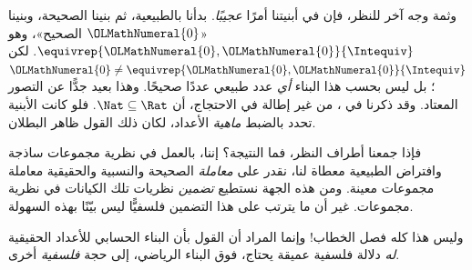 \documentclass[../../../include/open-logic-section]{subfiles}
\begin{document}
وثمة وجه آخر للنظر، فإن في أبنيتنا أمرًا \emph{عجيبًا}. بدأنا بالطبيعية، ثم بنينا الصحيحة، وبنينا «$\OLMathNumeral{0}$ الصحيح»، وهو $ \equivrep{\OLMathNumeral{0},\OLMathNumeral{0}}{\Intequiv}$. لكن $\OLMathNumeral{0} \neq
\equivrep{\OLMathNumeral{0},\OLMathNumeral{0}}{\Intequiv}$؛ بل ليس بحسب هذا البناء \emph{أي} عدد طبيعي عددًا صحيحًا. وهذا بعيد جدًّا عن التصور المعتاد. وقد ذكرنا في ، من غير إطالة في الاحتجاج، أن $\Nat \subseteq \Rat$. فلو كانت الأبنية تحدد بالضبط \emph{ماهية} الأعداد، لكان ذلك القول ظاهر البطلان.

فإذا جمعنا أطراف النظر، فما النتيجة؟ إننا، بالعمل في نظرية مجموعات ساذجة وافتراض الطبيعية معطاة لنا، نقدر على \emph{معاملة} الصحيحة والنسبية والحقيقية معاملة مجموعات معينة. ومن هذه الجهة نستطيع \emph{تضمين} نظريات تلك الكيانات في نظرية مجموعات. غير أن ما يترتب على هذا التضمين فلسفيًّا ليس بيّنًا بهذه السهولة.

وليس هذا كله فصل الخطاب!{} وإنما المراد أن القول بأن البناء الحسابي للأعداد الحقيقية \emph{له} دلالة فلسفية عميقة يحتاج، فوق البناء الرياضي، إلى حجة \emph{فلسفية} أخرى.

\end{document}
